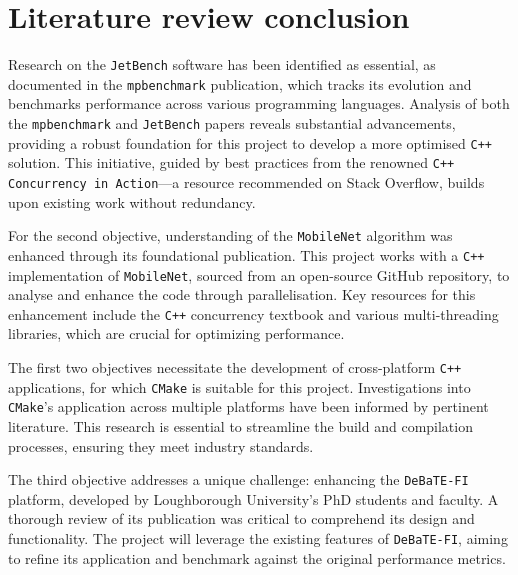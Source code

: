 \section{Literature review conclusion}

Research on the \texttt{JetBench} software has been identified as essential, as documented in the \texttt{mpbenchmark} publication\cite{mpbenchmark_paper}, which tracks its evolution and benchmarks performance across various programming languages. Analysis of both the \texttt{mpbenchmark} and \texttt{JetBench} papers\cite{JetBench_paper}\cite{mpbenchmark_paper} reveals substantial advancements, providing a robust foundation for this project to develop a more optimised \texttt{C++} solution. This initiative, guided by best practices from the renowned \texttt{C++ Concurrency in Action}\cite{c++_concurrency_in_action}—a resource recommended on Stack Overflow\cite{c++_books_stackoverflow}, builds upon existing work without redundancy.

For the second objective, understanding of the \texttt{MobileNet} algorithm was enhanced through its foundational publication\cite{mobilenet_paper}. This project works with a \texttt{C++} implementation of \texttt{MobileNet}, sourced from an open-source GitHub repository\cite{mobilenet_repo}, to analyse and enhance the code through parallelisation. Key resources for this enhancement include the \texttt{C++} concurrency textbook\cite{c++_concurrency_in_action} and various multi-threading libraries\cite{openmp_usage_hpc}, which are crucial for optimizing performance.

The first two objectives necessitate the development of cross-platform \texttt{C++} applications, for which \texttt{CMake} is suitable for this project. Investigations into \texttt{CMake}'s application across multiple platforms have been informed by pertinent literature\cite{cmake_publication_1}\cite{cmake_publication_2}. This research is essential to streamline the build and compilation processes, ensuring they meet industry standards.

The third objective addresses a unique challenge: enhancing the \texttt{DeBaTE-FI} platform, developed by Loughborough University’s PhD students and faculty\cite{debate_fi_publication}. A thorough review of its publication was critical to comprehend its design and functionality. The project will leverage the existing features of \texttt{DeBaTE-FI}, aiming to refine its application and benchmark against the original performance metrics. 


